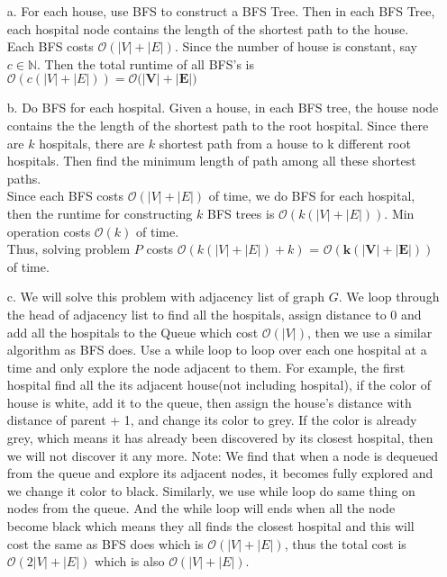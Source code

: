 \documentclass[10pt]{article}
\begin{document}
\begin{itemize}
\item[a.]
For each house, use BFS to construct a BFS Tree. Then in each BFS Tree, each hospital node contains the length of the shortest path to the house. \\
Each BFS costs $\mathcal{O}(|V|+|E|)$. Since the number of house is constant, say $c\in\mathbb{N}$. Then the total runtime of all BFS's is $\mathcal{O}(c(|V|+|E|))=\boldsymbol{\mathcal{O}(|V|+|E|})$
\item[b.]
Do BFS for each hospital. Given a house, in each BFS tree, the house node contains the the length of the shortest path to the root hospital. Since there are $k$ hospitals, there are $k$ shortest path from a house to k different root hospitals. Then find the minimum length of path among all these shortest paths.\\
Since each BFS costs $\mathcal{O}(|V|+|E|)$ of time, we do BFS for each hospital, then the runtime for constructing $k$ BFS trees is $\mathcal{O}(k(|V|+|E|))$. Min operation costs $\mathcal{O}(k)$ of time.\\
Thus, solving problem $P$ costs $\mathcal{O}(k(|V|+|E|)+k)$ = $\boldsymbol{\mathcal{O}(k(|V|+|E|))}$ of time.
\item[c.]
We will solve this problem with adjacency list of graph $G$. We loop through the head of adjacency list to find all the hospitals, assign distance to 0 and add all the hospitals to the Queue which cost $\mathcal{O}(|V|)$, then we use a similar algorithm as BFS does. Use a while loop to loop over each one hospital at a time and only explore the node adjacent to them. For example, the first hospital find all the its adjacent house(not including hospital), if the color of house is white, add it to the queue, then assign the house's distance with distance of parent + 1,  and change its color to grey. If the color is already grey, which means it has already been discovered by its closest hospital, then we will not discover it any more. Note: We find that when a node is dequeued from the queue and explore its adjacent nodes, it becomes fully explored and we change it color to black. Similarly, we use while loop do same thing on nodes from the queue. And the while loop will ends when all the node become black which means they all finds the closest hospital and this will cost the same as BFS does which is $\mathcal{O}(|V|+|E|)$, thus the total cost is $\mathcal{O}(2|V| + |E|)$ which is also $\mathcal{O}(|V| + |E|)$.

\end{itemize}
\end{document}
